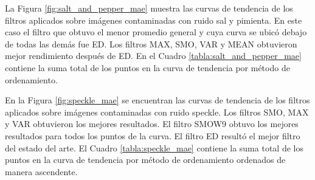 La Figura \ref{fig:salt_and_pepper_mae} muestra las curvas de tendencia de los filtros aplicados sobre imágenes contaminadas con ruido sal y pimienta. En este caso el filtro que obtuvo el menor promedio general y cuya curva se ubicó debajo de todas las demás fue ED. Los filtros MAX, SMO, VAR y MEAN obtuvieron mejor rendimiento después de ED. En el Cuadro \ref{tabla:salt_and_pepper_mae} contiene  la suma total de los puntos en la curva de tendencia por método de ordenamiento.

En la Figura \ref{fig:speckle_mae} se encuentran las curvas de tendencia de los filtros aplicados sobre imágenes contaminadas con ruido speckle. Los filtros SMO, MAX y VAR obtuvieron los mejores resultados. El filtro SMOW9 obtuvo los mejores resultados para todos los puntos de la curva. El filtro ED resultó el mejor filtro del estado del arte. El Cuadro \ref{tabla:speckle_mae} contiene  la suma total de los puntos en la curva de tendencia por método de ordenamiento ordenados de manera ascendente.

%
%

